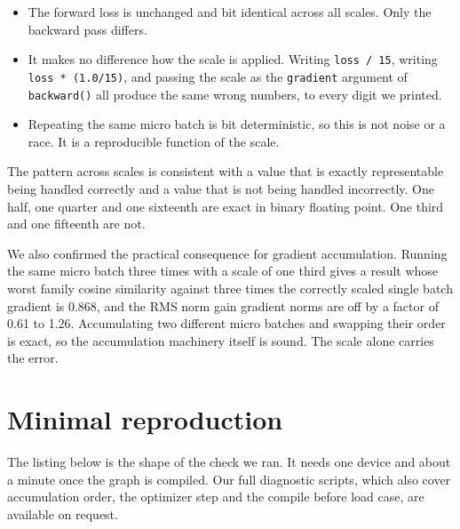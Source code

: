 \documentclass[11pt,a4paper]{article}
\newcommand{\code}[1]{\texttt{\small #1}}
\begin{document}
\begin{itemize}
\item The forward loss is unchanged and bit identical across all scales. Only the
      backward pass differs.
\item It makes no difference how the scale is applied. Writing \code{loss / 15},
      writing \code{loss * (1.0/15)}, and passing the scale as the
      \code{gradient} argument of \code{backward()} all produce the same wrong
      numbers, to every digit we printed.
\item Repeating the same micro batch is bit deterministic, so this is not noise
      or a race. It is a reproducible function of the scale.
\end{itemize}

The pattern across scales is consistent with a value that is exactly
representable being handled correctly and a value that is not being handled
incorrectly. One half, one quarter and one sixteenth are exact in binary
floating point. One third and one fifteenth are not.

We also confirmed the practical consequence for gradient accumulation. Running the
same micro batch three times with a scale of one third gives a result whose worst
family cosine similarity against three times the correctly scaled single batch
gradient is 0.868, and the RMS norm gain gradient norms are off by a factor of
0.61 to 1.26. Accumulating two different micro batches and swapping their order
is exact, so the accumulation machinery itself is sound. The scale alone carries
the error.

\section{Minimal reproduction}

The listing below is the shape of the check we ran. It needs one device and about
a minute once the graph is compiled. Our full diagnostic scripts, which also cover
accumulation order, the optimizer step and the compile before load case, are
available on request.
\end{document}
